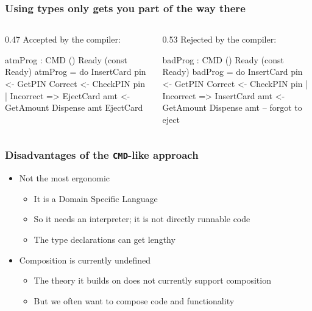 \documentclass[compress,handout]{beamer}
\begin{document}
\begin{frame}[fragile]  %
  \frametitle{Using types only gets you part of the way there}

  \begin{columns}
  \begin{column}{0.47\framewidth}
    {\color{staMidGreen} Accepted by the compiler:}
    \begin{idrislisting}[basicstyle=\ttfamily\scriptsize]
atmProg : CMD ()
            Ready (const Ready)
atmProg =
  do InsertCard
     pin <- GetPIN
     Correct <- CheckPIN pin
       | Incorrect => EjectCard
     amt <- GetAmount
     Dispense amt 
     EjectCard
    \end{idrislisting}
  \end{column}

  \pause  %

  \hspace*{-1.5mm}
  \vrule{}

  \begin{column}{0.53\framewidth}
    {\color{red} Rejected by the compiler:}
    \begin{idrislisting}[basicstyle=\ttfamily\scriptsize]
badProg : CMD ()
            Ready (const Ready)
badProg =
  do InsertCard
     pin <- GetPIN
     Correct <- CheckPIN pin
       | Incorrect => InsertCard
     amt <- GetAmount
     Dispense amt 
     -- forgot to eject
    \end{idrislisting}
  \end{column}
  \end{columns}
\end{frame}


\begin{frame}
  \frametitle{Disadvantages of the \texttt{CMD}-like approach}

  \begin{itemize}
    \item<1-> Not the most ergonomic
    \begin{itemize}
      \item<2-> It is a Domain Specific Language
      \item<3-> So it needs an interpreter; it is not directly runnable code
      \item<4-> The type declarations can get lengthy
    \end{itemize}
    \item<5-> Composition is currently undefined
    \begin{itemize}
      \item<6-> The theory it builds on does not currently support composition
      \item<7-> But we often want to compose code and functionality
    \end{itemize}
  \end{itemize}
\end{frame}
\end{document}
